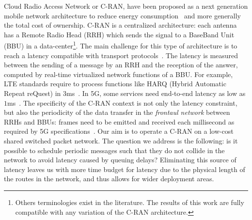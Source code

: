 \documentclass[a4paper,10pt]{journal}
\begin{document}
Cloud Radio Access Network or C-RAN, have been proposed as a next generation mobile network architecture to reduce energy consumption~\cite{gavrilovska2020cloud,mobile2011c,checko2014cloud} and more generally the total cost of ownership. C-RAN is a centralized architecture: each antenna has a Remote Radio Head (RRH) which sends the signal to a BaseBand Unit (BBU) in a data-center\footnote{Others terminologies exist in the literature. The results of this work are fully compatible with any variation of the C-RAN architecture.}.
The main challenge for this type of architecture is to reach a latency compatible with transport protocols~\cite{ieeep802}. The latency is measured between the sending of a message by an RRH and the reception of the answer, computed by real-time virtualized network functions of a BBU. For example, LTE standards require to process functions like HARQ (Hybrid Automatic Repeat reQuest) in $3$ms~\cite{bouguen2012lte}. In 5G, some services need end-to-end latency as low as $1$ms~\cite{dogra2020survey,3gpp5g,boccardi2014five}. The specificity of the C-RAN context is not only the latency constraint, but also the periodicity of the data transfer in the \emph{frontaul network} between RRHs and BBUs: frames need to be emitted and received each millisecond as required by 5G specifications~\cite{bouguen2012lte,romano2019imt}. Our aim is to operate a C-RAN on a low-cost shared switched packet network.
The question we address is the following: is it possible to schedule periodic messages such that they do not collide in the network to avoid latency caused by queuing delays? Eliminating this source of latency leaves us with more time budget for latency due to the physical length of the routes in the network, and thus allows for wider deployment areas.
\end{document}
